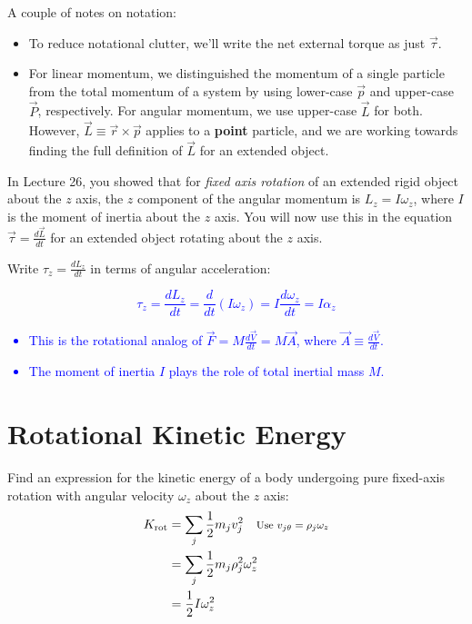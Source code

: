 \documentclass[11pt, letterpaper, openany]{book}
\newenvironment{exercise}[1][Exercise]{%
  \tcolorbox[blanker, breakable, left=1em,
    before skip=1em, after skip=1em,
    borderline west={3pt}{0pt}{PhysNavy},
    colback=PhysCream,
    before upper={\textcolor{PhysNavy}{\sffamily\bfseries #1:}\space}
  ]%
}{%
  \endtcolorbox%
}
\begin{document}
A couple of notes on notation:
\begin{itemize}
    \item To reduce notational clutter, we'll write the net external torque as just $\vec{\tau}$.
    \item For linear momentum, we distinguished the momentum of a single particle from the total momentum of a system by using lower-case $\vec{p}$ and upper-case $\vec{P}$, respectively. For angular momentum, we use upper-case $\vec{L}$ for both. However, $\vec{L} \equiv \vec{r} \times \vec{p}$ applies to a \textbf{point} particle, and we are working towards finding the full definition of $\vec{L}$ for an extended object.
\end{itemize}

In Lecture 26, you showed that for \textit{fixed axis rotation} of an extended rigid object about the $z$ axis, the $z$ component of the angular momentum is $L_z = I\omega_z$, where $I$ is the moment of inertia about the $z$ axis. You will now use this in the equation $\vec{\tau} = \frac{d\vec{L}}{dt}$ for an extended object rotating about the $z$ axis.

\begin{exercise}[Exercise 1]
Write $\tau_z = \frac{dL_z}{dt}$ in terms of angular acceleration: \\
\textcolor{blue}{
\[ \tau_z = \frac{dL_z}{dt} = \frac{d}{dt}(I\omega_z) = I\frac{d\omega_z}{dt} = I\alpha_z \]
\begin{itemize}
    \item This is the rotational analog of $\vec{F} = M\frac{d\vec{V}}{dt} = M\vec{A}$, where $\vec{A} \equiv \frac{d\vec{V}}{dt}$.
    \item The moment of inertia $I$ plays the role of total inertial mass $M$.
\end{itemize}
}
\end{exercise}

\section*{Rotational Kinetic Energy}

\begin{exercise}[Exercise 2]
Find an expression for the kinetic energy of a body undergoing pure fixed-axis rotation with angular velocity $\omega_z$ about the $z$ axis: \\
\textcolor{blue}{
\begin{align*}
    K_{\text{rot}} &= \sum_j \frac{1}{2}m_j v_j^2 \quad \text{\footnotesize{Use $v_{j\theta} = \rho_j\omega_z$}} \\
    &= \sum_j \frac{1}{2} m_j \rho_j^2 \omega_z^2 \\
    &= \frac{1}{2} I \omega_z^2
\end{align*}
}
\end{exercise}
\end{document}
